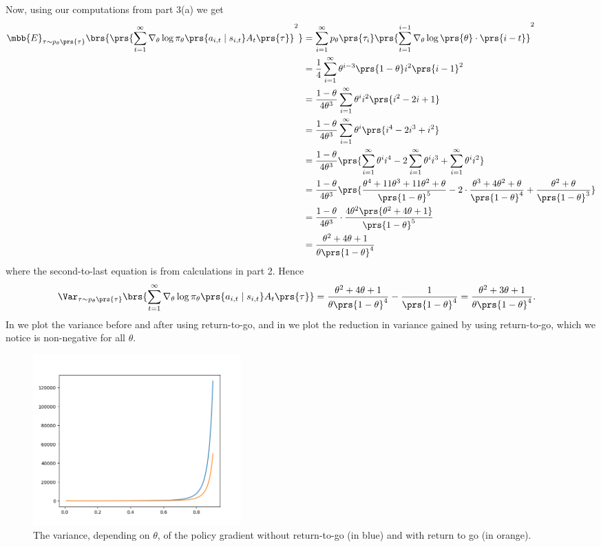 \documentclass[10pt]{article}
\theoremstyle{definition}
\begin{document}
\begin{enumerate}
\begin{enumerate}[label=(\alph*)]
Now, using our computations from part 3(a) we get
\begin{align*}
\mbb{E}_{\tau \sim p_\theta\prs{\tau}}\brs{\prs{\sum_{t=1}^{\infty} \nabla_{\theta} \log \pi_\theta \prs{a_{i,t} \mid s_{i,t}} A_t\prs{\tau}}^2} &= \sum_{i=1}^{\infty} p_\theta\prs{\tau_i} \prs{\sum_{t=1}^{i-1} \nabla_\theta \log\prs{\theta} \cdot \prs{i-t}}^2
\\&=
\frac{1}{4} \sum_{i=1}^{\infty} \theta^{i-3} \prs{1-\theta} i^2 \prs{i-1}^2
\\&=
\frac{1 - \theta}{4 \theta^3} \sum_{i=1}^\infty \theta^i i^2 \prs{i^2 -2i + 1}
\\&=
\frac{1 - \theta}{4 \theta^3} \sum_{i=1}^\infty \theta^i \prs{i^4 -2i^3 + i^2}
\\&=
\frac{1 - \theta}{4 \theta^3} \prs{\sum_{i=1}^{\infty} \theta^i i^4 -2 \sum_{i=1}^{\infty} \theta^i i^3 + \sum_{i=1}^\infty \theta^i i^2}
\\&=
\frac{1 - \theta}{4 \theta^3} \prs{\frac{\theta^4 + 11 \theta^3 + 11 \theta^2 + \theta}{\prs{1-\theta}^5} - 2 \cdot \frac{\theta^3 + 4\theta^2 + \theta}{\prs{1-\theta}^4} + \frac{\theta^2 + \theta}{\prs{1-\theta}^3}}
\\&=
\frac{1 - \theta}{4 \theta^3} \cdot \frac{4 \theta^2 \prs{\theta^2 + 4\theta + 1}}{\prs{1 - \theta}^5}
\\&=
\frac{\theta^2 + 4 \theta + 1}{\theta \prs{1-\theta}^4}
\end{align*}
where the second-to-last equation is from calculations in part 2.
Hence
\begin{align*}
\Var_{\tau \sim p_\theta\prs{\tau}}\brs{\sum_{t=1}^{\infty} \nabla_{\theta} \log \pi_\theta \prs{a_{i,t} \mid s_{i,t}} A_t\prs{\tau}} &=
\frac{\theta^2 + 4\theta + 1}{\theta \prs{1-\theta}^4} - \frac{1}{\prs{1-\theta}^4} = \frac{\theta^2 + 3\theta + 1}{\theta \prs{1-\theta}^4} \text{.}
\end{align*}
In  we plot the variance before and after using return-to-go, and in  we plot the reduction in variance gained by using return-to-go, which we notice is non-negative for all $\theta$.

\begin{figure}[h]
\caption{The variance, depending on $\theta$, of the policy gradient without return-to-go (in blue) and with return to go (in orange).}
\label{fig:variance}
\centering
\includegraphics[width=8cm]{Figure_1}
\end{figure}


\end{enumerate}
\end{enumerate}
\end{document}
